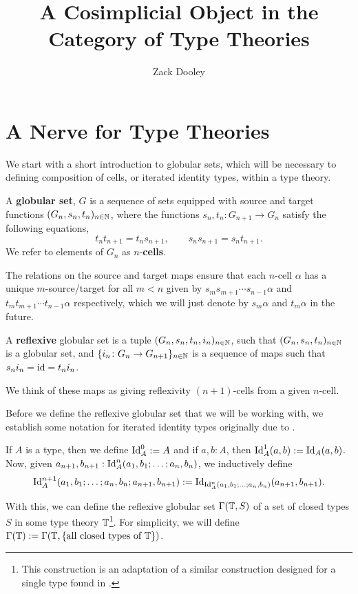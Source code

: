 \documentclass{article}
\title{A Cosimplicial Object in the Category of Type Theories}
\author{Zack Dooley}
\date{}
\begin{document}
\maketitle

\section{A Nerve for Type Theories}

We start with a short introduction to globular sets, which will be necessary to defining composition of cells, or iterated identity types, within a type theory.

\begin{defn}
    A \textbf{globular set}, $G$ is a sequence of sets equipped with source and target functions $(G_n,s_n,t_n)_{n\in\mathbb{N}}$, where the functions $s_n,t_n\colon G_{n+1}\to G_n$ satisfy the following equations,
    $$ t_nt_{n+1}=t_ns_{n+1},\qquad s_ns_{n+1}=s_nt_{n+1}. $$
    We refer to elements of $G_n$ as $n$-\textbf{cells}.
\end{defn}

The relations on the source and target maps ensure that each $n$-cell $\alpha$ has a unique $m$-source/target for all $m<n$ given by $s_ms_{m+1}\cdots s_{n-1}\alpha$ and $t_mt_{m+1}\cdots t_{n-1}\alpha$ respectively, which we will just denote by $s_m\alpha$ and $t_m\alpha$ in the future.

\begin{defn}
    A \textbf{reflexive} globular set is a tuple $(G_n,s_n,t_n,i_n)_{n\in\mathbb{N}}$, such that $(G_n,s_n,t_n)_{n\in\mathbb{N}}$ is a globular set, and $\{i_n\colon G_n\to G_{n+1}\}_{n\in\mathbb{N}}$ is a sequence of maps such that $s_ni_n=\operatorname{id}=t_ni_n$.
\end{defn}

We think of these maps as giving reflexivity $(n+1)$-cells from a given $n$-cell.

Before we define the reflexive globular set that we will be working with, we establish some notation for iterated identity types originally due to \cite{AHW}.

\begin{notn}
    If $A$ is a type, then we define $\operatorname{Id}_A^0:=A$ and if $a,b:A$, then $\operatorname{Id}_A^1(a,b):=\operatorname{Id}_A(a,b)$. Now, given $a_{n+1},b_{n+1}:\operatorname{Id}_A^n(a_1,b_1;\dots;a_n,b_n)$, we inductively define
    $$ \operatorname{Id}_A^{n+1}(a_1,b_1;\dots;a_n,b_n;a_{n+1},b_{n+1}):=\operatorname{Id}_{\operatorname{Id}^n_A(a_1,b_1;\dots;a_n,b_n)}(a_{n+1},b_{n+1}). $$
\end{notn}

With this, we can define the reflexive globular set $\Gamma(\mathbb{T},S)$ of a set of closed types $S$ in some type theory $\mathbb{T}$\footnote{This construction is an adaptation of a similar construction designed for a single type found in \cite{AHW}.}. For simplicity, we will define $\Gamma(\mathbb{T}):=\Gamma(\mathbb{T},\{\text{all closed types of }\mathbb{T}\})$.
\end{document}
